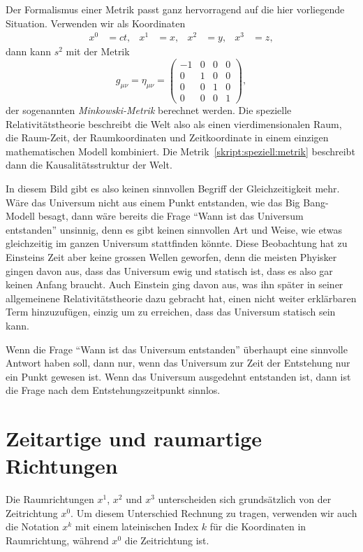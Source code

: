 Der Formalismus einer Metrik passt ganz hervorragend auf die hier
vorliegende Situation.
Verwenden wir als Koordinaten
\[
\begin{aligned}
x^0 &= ct,
&
x^1&=x,
&
x^2&=y,
&
x^3&=z,
\end{aligned}
\]
dann kann $s^2$ mit der Metrik
\begin{equation}
g_{\mu\nu}
=
\eta_{\mu\nu}
=
\begin{pmatrix}
-1&0&0&0\\
 0&1&0&0\\
 0&0&1&0\\
 0&0&0&1
\end{pmatrix},
\label{skript:speziell:metrik}
\end{equation}
der sogenannten
{\em Minkowski-Metrik}
%
berechnet werden.
Die spezielle Relativitätstheorie beschreibt die Welt also als einen
vierdimensionalen Raum, die Raum-Zeit, der Raumkoordinaten und Zeitkoordinate
in einem einzigen mathematischen Modell kombiniert.
Die Metrik~\eqref{skript:speziell:metrik} beschreibt dann die
Kausalitätsstruktur der Welt.

In diesem Bild gibt es also keinen sinnvollen Begriff der Gleichzeitigkeit
mehr.
%
Wäre das Universum nicht aus einem Punkt entstanden, wie das Big Bang-Modell
besagt, dann wäre bereits die Frage ``Wann ist das Universum entstanden''
unsinnig, denn es gibt keinen sinnvollen Art und Weise, wie etwas gleichzeitig
im ganzen Universum stattfinden könnte.
Diese Beobachtung hat zu Einsteins Zeit aber keine grossen Wellen
geworfen, denn die meisten Phyisker gingen davon aus, dass das Universum
ewig und statisch ist, dass es also gar keinen Anfang braucht.
Auch Einstein ging davon aus, was ihn später in seiner allgemeinene
Relativitätstheorie dazu gebracht hat, einen nicht weiter erklärbaren
Term hinzuzufügen, einzig um zu erreichen, dass das Universum statisch 
sein kann.

Wenn die Frage ``Wann ist das Universum entstanden'' überhaupt eine
sinnvolle Antwort haben soll, dann nur, wenn das Universum zur Zeit
der Entstehung nur ein Punkt gewesen ist.
Wenn das Universum ausgedehnt entstanden ist, dann ist die Frage
nach dem Entstehungszeitpunkt sinnlos.

\section{Zeitartige und raumartige Richtungen}
Die Raumrichtungen $x^1$, $x^2$ und $x^3$ unterscheiden sich grundsätzlich
von der Zeitrichtung $x^0$.
Um diesem Unterschied Rechnung zu tragen, verwenden wir auch die Notation
$x^k$ mit einem lateinischen Index $k$ für die Koordinaten in Raumrichtung,
während $x^0$ die Zeitrichtung ist.

